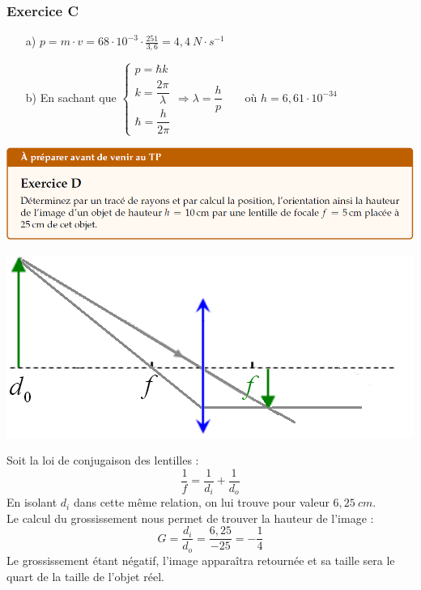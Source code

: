 \documentclass	[11pt, a4paper, openany]{book}
\begin{document}
		\subsubsection*{Exercice C}
		\begin{itemize}
			\item[a)]$p=m\cdot v=68\cdot10^{-3}\cdot\frac{251}{3,6}=4,4\ N\cdot s^{-1}$
			      
			\item[b)] En sachant que $\left\{\begin{array}{l}
			      p=\hbar k  \\
			      k=\dfrac{2\pi}{\lambda}\\
			      \hbar=\dfrac{h}{2\pi}
			\end{array}\right.\Rightarrow \lambda=\dfrac{h}{p}\qquad\text{où }h=6,61\cdot 10^{-34}$
		\end{itemize}
		\begin{center}
			\includegraphics[scale=0.60]{prepa/physmD.png}\\
		\end{center}
		\begin{center}
			\includegraphics[scale=0.60]{prepa/dessinsdegueu.png}
		\end{center}
		Soit la loi de conjugaison des lentilles :
		$$\frac{1}{f} = \frac{1}{d_i} + \frac{1}{d_o}$$
		En isolant $d_i$ dans cette même relation, on lui trouve pour valeur $6,25\ cm$.\\
		
		Le calcul du grossissement nous permet de trouver la hauteur de l'image : 
		$$G = \frac{d_i}{d_o} = \frac{6,25}{-25} = -\frac{1}{4}$$
		Le grossissement étant négatif, l'image apparaîtra retournée et sa taille sera le quart de la taille de l'objet réel.
		
\end{document}
